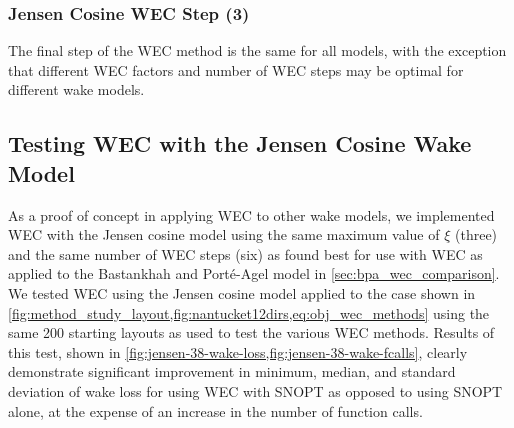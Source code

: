 \documentclass[a4paper]{jpconf}
\begin{document}
\subsubsection{Jensen Cosine WEC Step (3)}

The final step of the WEC method is the same for all models, with the exception that different WEC factors and number of WEC steps may be optimal for different wake models.

\subsection{Testing WEC with the Jensen Cosine Wake Model}
As a proof of concept in applying WEC to other wake models, we implemented WEC with the Jensen cosine model using the same maximum value of $\xi$ (three) and the same number of WEC steps (six) as found best for use with WEC as applied to the Bastankhah and Port\'{e}-Agel model in \cref{sec:bpa_wec_comparison}. We tested WEC using the Jensen cosine model applied to the case shown in \cref{fig:method_study_layout,fig:nantucket12dirs,eq:obj_wec_methods} using the same 200 starting layouts as used to test the various WEC methods. Results of this test, shown in \cref{fig:jensen-38-wake-loss,fig:jensen-38-wake-fcalls}, clearly demonstrate significant improvement in minimum, median, and standard deviation of wake loss for using WEC with SNOPT as opposed to using SNOPT alone, at the expense of an increase in the number of function calls.
\end{document}
